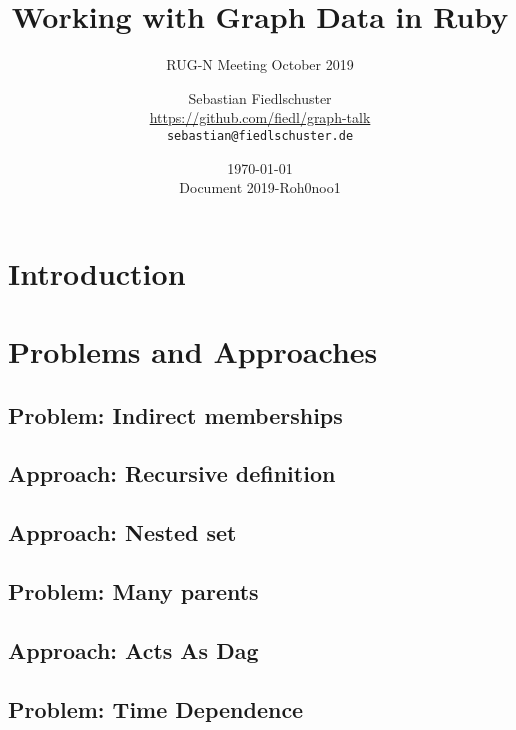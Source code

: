 \documentclass[green, 12pt]{beamer}
\title[Working with Graph Data in Ruby, \url{https://github.com/fiedl/graph-talk}]{Working with Graph Data in Ruby}
\subtitle{RUG-N Meeting October 2019}
\date{\today \\ \vspace*{2mm} \tiny{Document 2019-Roh0noo1} \normalsize}
\author[Sebastian Fiedlschuster]{Sebastian Fiedlschuster \\ \small{\url{https://github.com/fiedl/graph-talk}} \\ \small\texttt{sebastian@fiedlschuster.de}}
\begin{document}



\section{Introduction}



\section{Problems and Approaches}
\subsection{Problem: Indirect memberships}

\subsection{Approach: Recursive definition}

\subsection{Approach: Nested set}

\subsection{Problem: Many parents}

\subsection{Approach: Acts As Dag}

\subsection{Problem: Time Dependence}

\end{document}
